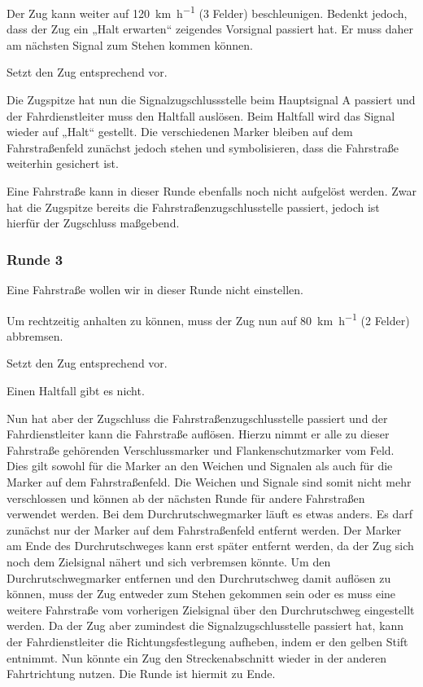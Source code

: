    Der Zug kann weiter auf \SI{120}{\kilo\metre\per\hour} (3 Felder) beschleunigen. Bedenkt jedoch, dass der Zug ein „Halt erwarten“ zeigendes Vorsignal passiert hat. Er muss daher am nächsten Signal zum Stehen kommen können.
  
   Setzt den Zug entsprechend vor.

   Die Zugspitze hat nun die Signalzugschlussstelle beim Hauptsignal A passiert und der Fahrdienstleiter muss den Haltfall auslösen. Beim Haltfall wird das Signal wieder auf „Halt“ gestellt. Die verschiedenen Marker bleiben auf dem Fahrstraßenfeld zunächst jedoch stehen und symbolisieren, dass die Fahrstraße weiterhin gesichert ist.

   Eine Fahrstraße kann in dieser Runde ebenfalls noch nicht aufgelöst werden. Zwar hat die Zugspitze bereits die Fahrstraßenzugschlusstelle passiert, jedoch ist hierfür der Zugschluss maßgebend.


\subsubsection*{Runde 3}
   Eine Fahrstraße wollen wir in dieser Runde nicht einstellen.

   Um rechtzeitig anhalten zu können, muss der Zug nun auf \SI{80}{\kilo\metre\per\hour} (2 Felder) abbremsen.

   Setzt den Zug entsprechend vor.

   Einen Haltfall gibt es nicht.

   Nun hat aber der Zugschluss die Fahrstraßenzugschlusstelle passiert und der Fahrdienstleiter kann die Fahrstraße auflösen. Hierzu nimmt er alle zu dieser Fahrstraße gehörenden Verschlussmarker und Flankenschutzmarker vom Feld. Dies gilt sowohl für die Marker an den Weichen und Signalen als auch für die Marker auf dem Fahrstraßenfeld. Die Weichen und Signale sind somit nicht mehr verschlossen und können ab der nächsten Runde für andere Fahrstraßen verwendet werden. Bei dem Durchrutschwegmarker läuft es etwas anders. Es darf zunächst nur der Marker auf dem Fahrstraßenfeld entfernt werden. Der Marker am Ende des Durchrutschweges kann erst später entfernt werden, da der Zug sich noch dem Zielsignal nähert und sich verbremsen könnte. Um den Durchrutschwegmarker entfernen und den Durchrutschweg damit auflösen zu können, muss der Zug entweder zum Stehen gekommen sein oder es muss eine weitere Fahrstraße vom vorherigen Zielsignal über den Durchrutschweg eingestellt werden. 
  Da der Zug aber zumindest die Signalzugschlusstelle passiert hat, kann der Fahrdienstleiter die Richtungsfestlegung aufheben, indem er den gelben Stift entnimmt. Nun könnte ein Zug den Streckenabschnitt wieder in der anderen Fahrtrichtung nutzen. Die Runde ist hiermit zu Ende.


